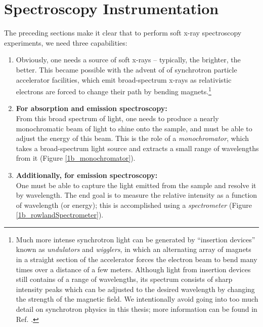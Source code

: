 \section{Spectroscopy Instrumentation}
The preceding sections make it clear that to perform soft x-ray spectroscopy experiments, we need three capabilities:
\begin{enumerate}
\item Obviously, one needs a source of soft x-rays -- typically, the brighter, the better.  This became possible with the advent of of synchrotron particle accelerator facilities, which emit broad-spectrum x-rays as relativistic electrons are forced to change their path by bending magnets.\footnote{Much more intense synchrotron light can be generated by ``insertion devices'' known as \emph{undulators} and \emph{wigglers}, in which an alternating array of magnets in a straight section of the accelerator forces the electron beam to bend many times over a distance of a few meters.  Although light from insertion devices still contains of a range of wavelengths, its spectrum consists of sharp intensity peaks which can be adjusted to the desired wavelength by changing the strength of the magnetic field.  We intentionally avoid going into too much detail on synchrotron physics in this thesis; more information can be found in Ref. \cite{Pea97}.}
\item \textbf{For absorption and emission spectroscopy:}\\
From this broad spectrum of light, one needs to produce a nearly monochromatic beam of light to shine onto the sample, and must be able to adjust the energy of this beam.  This is the role of a \emph{monochromator}, which takes a broad-spectrum light source and extracts a small range of wavelengths from it (Figure \ref{1b_monochromator}).
\item \textbf{Additionally, for emission spectroscopy:}\\
One must be able to capture the light emitted from the sample and resolve it by wavelength.  The end goal is to measure the relative intensity as a function of wavelength (or energy); this is accomplished using a \emph{spectrometer} (Figure \ref{1b_rowlandSpectrometer}).
\end{enumerate}


